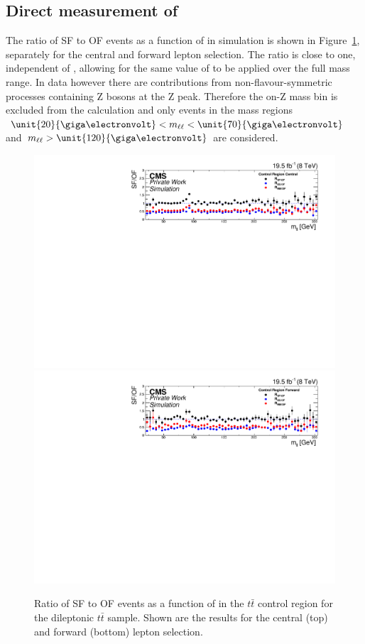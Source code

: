 \subsection{Direct measurement of \Rsfof}
The ratio of SF to OF events as a function of \mll in simulation is shown in Figure~\ref{fig:controlRatioMC}, separately for the central and forward lepton selection. The ratio is close to one, independent of \mll, allowing for the same value of \Rsfof to be applied over the full mass range. In data however there are contributions from non-flavour-symmetric processes containing Z bosons at the Z peak. Therefore the on-Z mass bin is excluded from the calculation and only events in the mass regions $\unit{20}{\giga\electronvolt}< \mll < \unit{70}{\giga\electronvolt}$ and $\mll > \unit{120}{\giga\electronvolt}$ are considered.   	
\begin{figure}
\begin{center}
\includegraphics[scale=0.35]{plots/BG/control/rSFOF_ControlCentral_Full2012_Mll_None_MC.pdf}\\
\includegraphics[scale=0.35]{plots/BG/control/rSFOF_ControlForward_Full2012_Mll_None_MC.pdf}
\caption{Ratio of SF to OF events as a function of \mll in the $t\bar{t}$ control region for the dileptonic $t\bar{t}$ sample. Shown are the results for the central (top) and forward (bottom) lepton selection.}
\label{fig:controlRatioMC}
\end{center}
\end{figure}
